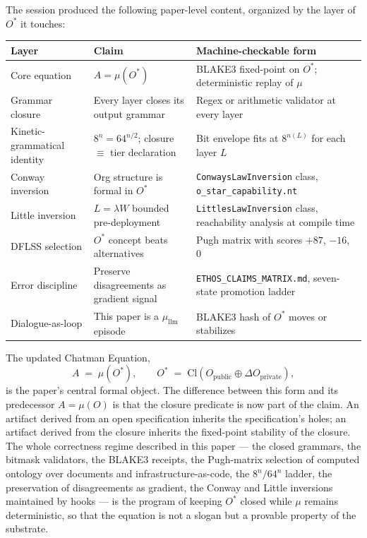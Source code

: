 \documentclass[11pt,letterpaper]{article}
\begin{document}
The session produced the following paper-level content, organized by the layer of $O^{\ast}$ it touches:

\begin{center}
\begin{tabular}{@{}p{3.4cm}p{5.2cm}p{5.0cm}@{}}
\toprule
\textbf{Layer} & \textbf{Claim} & \textbf{Machine-checkable form} \\
\midrule
Core equation & $A = \mu(O^{\ast})$ & BLAKE3 fixed-point on $O^{\ast}$; deterministic replay of $\mu$ \\
Grammar closure & Every layer closes its output grammar & Regex or arithmetic validator at every layer \\
Kinetic-grammatical identity & $8^{n} = 64^{n/2}$; closure $\equiv$ tier declaration & Bit envelope fits at $8^{n(L)}$ for each layer $L$ \\
Conway inversion & Org structure is formal in $O^{\ast}$ & \texttt{ConwaysLawInversion} class, \texttt{o\_star\_capability.nt} \\
Little inversion & $L = \lambda W$ bounded pre-deployment & \texttt{LittlesLawInversion} class, reachability analysis at compile time \\
DFLSS selection & $O^{\ast}$ concept beats alternatives & Pugh matrix with scores $+87$, $-16$, $0$ \\
Error discipline & Preserve disagreements as gradient signal & \texttt{ETHOS\_CLAIMS\_MATRIX.md}, seven-state promotion ladder \\
Dialogue-as-loop & This paper is a $\mu_{\mathrm{llm}}$ episode & BLAKE3 hash of $O^{\ast}$ moves or stabilizes \\
\bottomrule
\end{tabular}
\end{center}

The updated Chatman Equation,
\[
A \;=\; \mu\!\left(O^{\ast}\right), \qquad O^{\ast} \;=\; \mathrm{Cl}\!\left(O_{\mathrm{public}} \oplus \Delta O_{\mathrm{private}}\right),
\]
is the paper's central formal object. The difference between this form and its predecessor $A = \mu(O)$ is that the closure predicate is now part of the claim. An artifact derived from an open specification inherits the specification's holes; an artifact derived from the closure inherits the fixed-point stability of the closure. The whole correctness regime described in this paper --- the closed grammars, the bitmask validators, the BLAKE3 receipts, the Pugh-matrix selection of computed ontology over documents and infrastructure-as-code, the $8^{n} / 64^{n}$ ladder, the preservation of disagreements as gradient, the Conway and Little inversions maintained by hooks --- is the program of keeping $O^{\ast}$ closed while $\mu$ remains deterministic, so that the equation is not a slogan but a provable property of the substrate.
\end{document}
